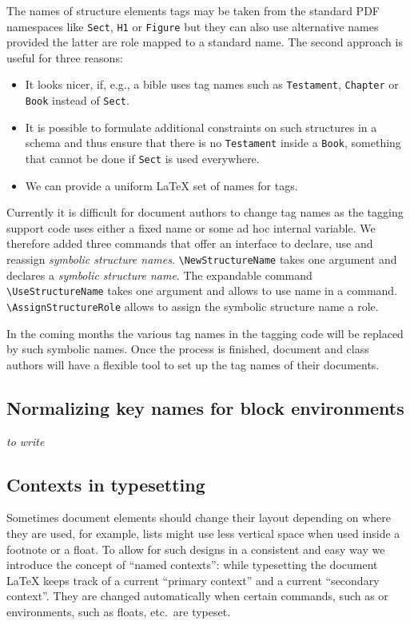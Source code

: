 \documentclass{ltnews}
\begin{document}
 The names of structure elements tags may be taken from the standard
 PDF namespaces like \verb|Sect|, \verb|H1| or \verb|Figure| but they
 can also use alternative names provided the latter are role mapped to
 a standard name. The second approach is useful for three reasons:
  \begin{itemize}
  \item It looks nicer, if, e.g., a bible uses tag names such as
    \texttt{Testament}, \texttt{Chapter} or \texttt{Book} instead of
    \texttt{Sect}.
  \item It is possible to formulate additional constraints on such
    structures in a schema and thus ensure that there is no
    \texttt{Testament} inside a \texttt{Book}, something that cannot
    be done if \texttt{Sect} is used everywhere.
  \item We can provide a uniform LaTeX set of names for tags.
  \end{itemize}
  
  Currently it is difficult for document authors to change tag names
  as the tagging support code uses either a fixed name or some ad hoc
  internal variable. We therefore added three commands that offer an
  interface to declare, use and reassign \emph{symbolic structure
  names}. \verb+\NewStructureName+ takes one argument and declares a
  \emph{symbolic structure name}. The expandable command
  \verb+\UseStructureName+ takes one argument and allows to use name
  in a  command. \verb+\AssignStructureRole+ allows
  to assign the symbolic structure name a role.

  In the coming months the various tag names in the tagging code will
  be replaced by such symbolic names. Once the process is finished,
  document and class authors will have a flexible tool to set up the
  tag names of their documents.


\subsection{Normalizing key names for block environments}

\emph{to write}


\subsection{Contexts in typesetting}

Sometimes document elements should change their layout depending on
where they are used, for example, lists might use less vertical space
when used inside a footnote or a float. To allow for such designs in a
consistent and easy way we introduce the concept of \enquote{named
  contexts}: while typesetting the document \LaTeX{} keeps track of a
current \enquote{primary context} and a current \enquote{secondary
  context}. They are changed automatically when certain commands, such
as  or environments, such as floats, etc.\ are typeset.
\end{document}
